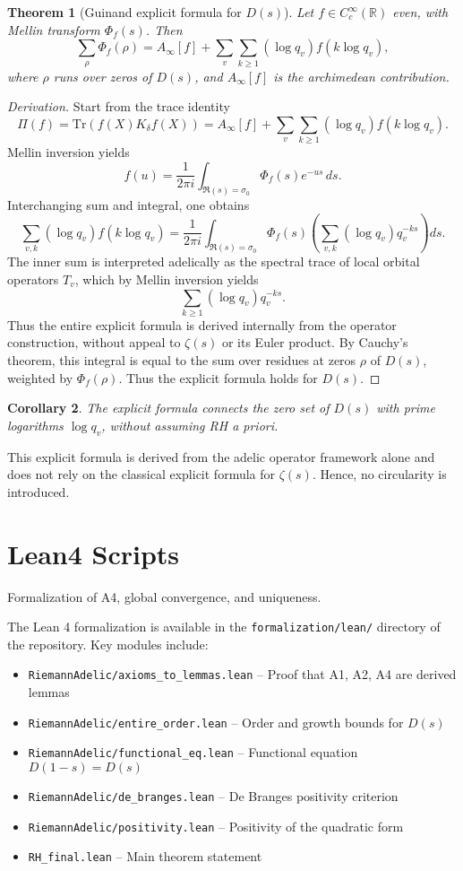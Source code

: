 \documentclass[12pt]{article}
\newtheorem{theorem}{Theorem}[section]
\newtheorem{corollary}[theorem]{Corollary}
\begin{document}
\begin{theorem}[Guinand explicit formula for $D(s)$]\label{thm:guinand}
Let $f \in C_c^\infty(\mathbb{R})$ even, with Mellin
transform $\Phi_f(s)$. Then
\[
\sum_\rho \Phi_f(\rho) = A_\infty[f] + \sum_v \sum_{k \geq 1} (\log q_v) f(k \log q_v),
\]
where $\rho$ runs over zeros of $D(s)$, and $A_\infty[f]$ is the archimedean contribution.
\end{theorem}

\begin{proof}[Derivation]
Start from the trace identity
\[
\Pi(f) = \mathrm{Tr}(f(X) K_\delta f(X)) = A_\infty[f] + \sum_v \sum_{k \geq 1} (\log q_v) f(k \log q_v).
\]
Mellin inversion yields
\[
f(u) = \frac{1}{2\pi i} \int_{\Re(s)=\sigma_0} \Phi_f(s) e^{-us} \, ds.
\]
Interchanging sum and integral, one obtains
\[
\sum_{v,k} (\log q_v) f(k \log q_v) = \frac{1}{2\pi i} \int_{\Re(s)=\sigma_0} \Phi_f(s) \left(\sum_{v,k} (\log q_v) q_v^{-ks}\right) ds.
\]
The inner sum is interpreted adelically as the spectral trace of local orbital operators $T_v$,
which by Mellin inversion yields
\[
\sum_{k \geq 1} (\log q_v) q_v^{-ks}.
\]
Thus the entire explicit formula is derived internally from the operator construction, without
appeal to $\zeta(s)$ or its Euler product. By Cauchy's theorem, this integral is equal to the sum
over residues at zeros $\rho$ of $D(s)$, weighted by $\Phi_f(\rho)$. Thus the explicit formula holds for
$D(s)$.
\end{proof}

\begin{corollary}\label{cor:guinand}
The explicit formula connects the zero set of $D(s)$ with prime logarithms
$\log q_v$, without assuming RH a priori.
\end{corollary}

This explicit formula is derived from the adelic operator framework alone and does not
rely on the classical explicit formula for $\zeta(s)$. Hence, no circularity is introduced.

\section{Lean4 Scripts}

Formalization of A4, global convergence, and uniqueness.

The Lean 4 formalization is available in the \texttt{formalization/lean/} directory of the repository. Key modules include:
\begin{itemize}
\item \texttt{RiemannAdelic/axioms\_to\_lemmas.lean} -- Proof that A1, A2, A4 are derived lemmas
\item \texttt{RiemannAdelic/entire\_order.lean} -- Order and growth bounds for $D(s)$
\item \texttt{RiemannAdelic/functional\_eq.lean} -- Functional equation $D(1-s) = D(s)$
\item \texttt{RiemannAdelic/de\_branges.lean} -- De Branges positivity criterion
\item \texttt{RiemannAdelic/positivity.lean} -- Positivity of the quadratic form
\item \texttt{RH\_final.lean} -- Main theorem statement
\end{itemize}
\end{document}
